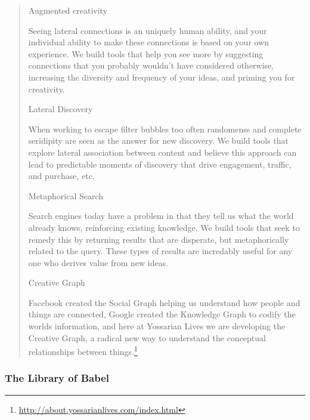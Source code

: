 \begin{quote}
  Augmented creativity

  Seeing lateral connections is an uniquely human ability, and your individual ability to make these connections is based on your own experience. We build tools that help you see more by suggesting connections that you probably wouldn't have considered otherwise, increasing the diversity and frequency of your ideas, and priming you for creativity.

  Lateral Discovery

  When working to escape filter bubbles too often randomenss and complete seridipity are seen as the answer for new discovery. We build tools that explore lateral association between content and believe this approach can lead to predictable moments of discovery that drive engagement, traffic, and purchase, etc.

  Metaphorical Search

  Search engines today have a problem in that they tell us what the world already knows, reinforcing existing knowledge. We build tools that seek to remedy this by returning results that are disperate, but metaphorically related to the query. These types of results are incredably useful for any one who derives value from new ideas.

  Creative Graph

  Facebook created the Social Graph helping us understand how people and things are connected, Google created the Knowledge Graph to codify the worlds information, and here at Yossarian Lives we are developing the Creative Graph, a radical new way to understand the conceptual relationships between things.\footnote{\url{http://about.yossarianlives.com/index.html}}
\end{quote}


\subsubsection*{The Library of Babel}

